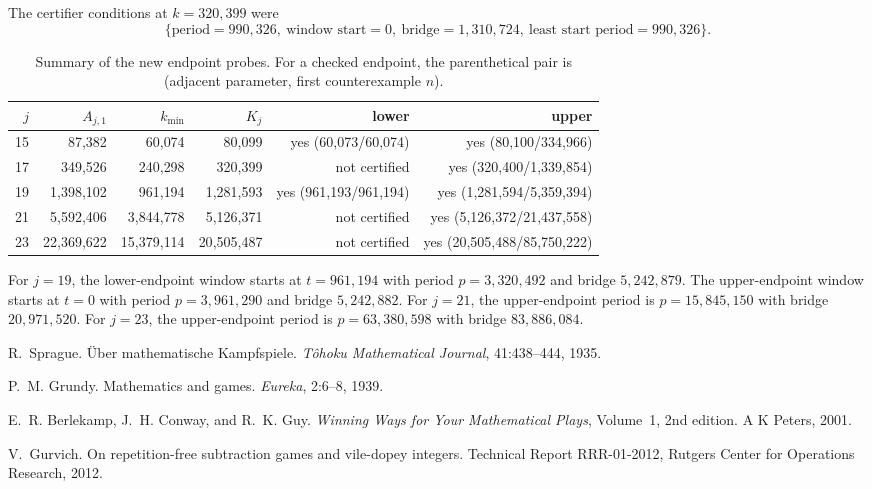 \documentclass[11pt]{article}
\theoremstyle{remark}
\begin{document}
The certifier conditions at \(k=320{,}399\) were
\[
\{\text{period}=990{,}326,\ \text{window start}=0,\ \text{bridge}=1{,}310{,}724,\ \text{least start period}=990{,}326\}.
\]

\begin{table}[h]
\centering
\scriptsize
\caption{Summary of the new endpoint probes. For a checked endpoint, the parenthetical pair is (adjacent parameter, first counterexample \(n\)).}
\begin{tabular}{rrrrrr}
\toprule
\(j\) & \(A_{j,1}\) & \(k_{\min}\) & \(K_j\) & lower & upper\\
\midrule
15 & 87{,}382 & 60{,}074 & 80{,}099 & yes (60{,}073/60{,}074) & yes (80{,}100/334{,}966)\\
17 & 349{,}526 & 240{,}298 & 320{,}399 & not certified & yes (320{,}400/1{,}339{,}854)\\
19 & 1{,}398{,}102 & 961{,}194 & 1{,}281{,}593 & yes (961{,}193/961{,}194) & yes (1{,}281{,}594/5{,}359{,}394)\\
21 & 5{,}592{,}406 & 3{,}844{,}778 & 5{,}126{,}371 & not certified & yes (5{,}126{,}372/21{,}437{,}558)\\
23 & 22{,}369{,}622 & 15{,}379{,}114 & 20{,}505{,}487 & not certified & yes (20{,}505{,}488/85{,}750{,}222)\\
\bottomrule
\end{tabular}
\end{table}

For \(j=19\), the lower-endpoint window starts at \(t=961{,}194\) with period
\(p=3{,}320{,}492\) and bridge \(5{,}242{,}879\). The upper-endpoint window starts
at \(t=0\) with period \(p=3{,}961{,}290\) and bridge \(5{,}242{,}882\). For
\(j=21\), the upper-endpoint period is \(p=15{,}845{,}150\) with bridge
\(20{,}971{,}520\). For \(j=23\), the upper-endpoint period is \(p=63{,}380{,}598\)
with bridge \(83{,}886{,}084\).

\begin{thebibliography}{9}
R.~Sprague.
\newblock \"Uber mathematische Kampfspiele.
\newblock \emph{T\^ohoku Mathematical Journal}, 41:438--444, 1935.

P.~M. Grundy.
\newblock Mathematics and games.
\newblock \emph{Eureka}, 2:6--8, 1939.

E.~R. Berlekamp, J.~H. Conway, and R.~K. Guy.
\newblock \emph{Winning Ways for Your Mathematical Plays}, Volume~1, 2nd edition.
\newblock A K Peters, 2001.

V.~Gurvich.
\newblock On repetition-free subtraction games and vile-dopey integers.
\newblock Technical Report RRR-01-2012, Rutgers Center for Operations Research, 2012.
\end{thebibliography}
\end{document}
